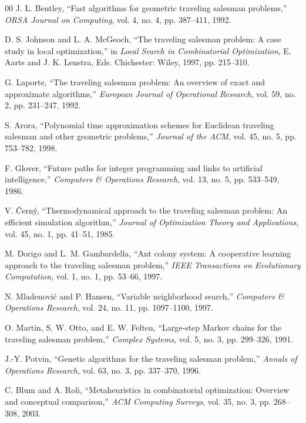 \documentclass[conference]{IEEEtran}
\begin{document}
\begin{thebibliography}{00}
 J. L. Bentley,
``Fast algorithms for geometric traveling salesman problems,''
\textit{ORSA Journal on Computing}, vol. 4, no. 4, pp. 387--411, 1992.

 D. S. Johnson and L. A. McGeoch,
``The traveling salesman problem: A case study in local optimization,''
in \textit{Local Search in Combinatorial Optimization}, E. Aarts and J. K. Lenstra, Eds.
Chichester: Wiley, 1997, pp. 215--310.

 G. Laporte,
``The traveling salesman problem: An overview of exact and approximate algorithms,''
\textit{European Journal of Operational Research}, vol. 59, no. 2, pp. 231--247, 1992.

 S. Arora,
``Polynomial time approximation schemes for Euclidean traveling salesman and other geometric problems,''
\textit{Journal of the ACM}, vol. 45, no. 5, pp. 753--782, 1998.

 F. Glover,
``Future paths for integer programming and links to artificial intelligence,''
\textit{Computers \& Operations Research}, vol. 13, no. 5, pp. 533--549, 1986.

 V. \v{C}ern\'y,
``Thermodynamical approach to the traveling salesman problem: An efficient simulation algorithm,''
\textit{Journal of Optimization Theory and Applications}, vol. 45, no. 1, pp. 41--51, 1985.

 M. Dorigo and L. M. Gambardella,
``Ant colony system: A cooperative learning approach to the traveling salesman problem,''
\textit{IEEE Transactions on Evolutionary Computation}, vol. 1, no. 1, pp. 53--66, 1997.

 N. Mladenovi\'c and P. Hansen,
``Variable neighborhood search,''
\textit{Computers \& Operations Research}, vol. 24, no. 11, pp. 1097--1100, 1997.

 O. Martin, S. W. Otto, and E. W. Felten,
``Large-step Markov chains for the traveling salesman problem,''
\textit{Complex Systems}, vol. 5, no. 3, pp. 299--326, 1991.

 J.-Y. Potvin,
``Genetic algorithms for the traveling salesman problem,''
\textit{Annals of Operations Research}, vol. 63, no. 3, pp. 337--370, 1996.

 C. Blum and A. Roli,
``Metaheuristics in combinatorial optimization: Overview and conceptual comparison,''
\textit{ACM Computing Surveys}, vol. 35, no. 3, pp. 268--308, 2003.


\end{thebibliography}
\end{document}
